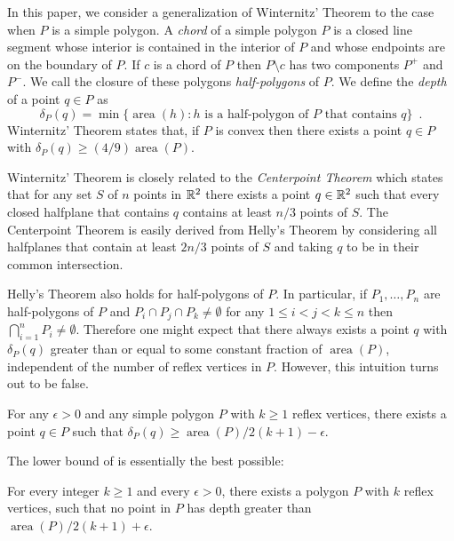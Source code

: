 \documentclass{birkjour}
\DeclareMathOperator{\area}{area}
\begin{document}
In this paper, we consider a generalization of Winternitz' Theorem to
the case when $P$ is a simple polygon.  A \emph{chord} of a simple
polygon $P$ is a closed line segment whose interior is contained in
the interior of $P$ and whose endpoints are on the boundary of $P$.
If $c$ is a chord of $P$ then $P\setminus c$ has two components $P^+$
and $P^-$.  We call the closure of these polygons \emph{half-polygons}
of $P$.  We define the \emph{depth} of a point $q\in P$ as 
\[
     \delta_P(q) = \min\{\area(h) : \mbox{$h$ is a half-polygon
	of $P$ that contains $q$} \} \enspace .
\]
Winternitz' Theorem states that, if $P$ is convex then there exists a
point $q\in P$ with $\delta_P(q)\ge (4/9)\area(P)$.  

Winternitz' Theorem is closely related to the \emph{Centerpoint
Theorem} \cite{m02,pa95} which states that for any set $S$ of $n$
points in $\mathbb{R}^2$ there exists a point $q\in\mathbb{R}^2$ such that every
closed halfplane that contains $q$ contains at least $n/3$
points of $S$.  The Centerpoint Theorem is easily derived from Helly's
Theorem \cite{e93} by considering all halfplanes that contain at least
$2n/3$ points of $S$ and taking $q$ to be in their common
intersection.

Helly's Theorem also holds for half-polygons of $P$.  In particular,
if $P_1,\ldots,P_n$ are half-polygons of $P$ and $P_i\cap P_j\cap
P_k\neq \emptyset$ for any $1\le i < j < k\le n$ then $\bigcap_{i=1}^n
P_i\neq \emptyset$.  Therefore one might expect that there always
exists a point $q$ with $\delta_P(q)$ greater than or equal to some
constant fraction of $\area(P)$, independent of the number of reflex
vertices in $P$.  However, this intuition turns out to be false.

\begin{thm}
For any $\epsilon > 0$ and any simple polygon $P$ with $k \ge 1$
reflex vertices, there exists a point $q\in P$ such that
$\delta_P(q)\ge \area(P)/2(k+1)-\epsilon$.
\end{thm}

The lower bound of  is essentially the best
possible:

\begin{thm}
For every integer $k\ge 1$ and every $\epsilon > 0$,
there exists a polygon $P$ with $k$ reflex vertices, such that no point
in $P$ has depth greater than  $\area(P)/2(k+1) + \epsilon$.
\end{thm}
\end{document}
